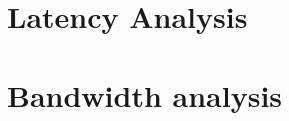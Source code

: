 \documentclass[IN,11pt,twoside,openright,idp,english]{tumthesis}
\begin{document}


\section{Latency Analysis}



\section{Bandwidth analysis}



\end{document}
